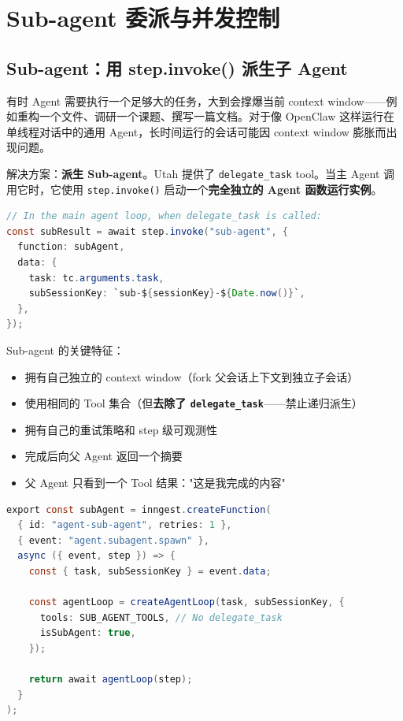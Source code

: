 \section{Sub-agent 委派与并发控制}

\subsection{Sub-agent：用 step.invoke() 派生子 Agent}

有时 Agent 需要执行一个足够大的任务，大到会撑爆当前 context window——例如重构一个文件、调研一个课题、撰写一篇文档。对于像 OpenClaw 这样运行在单线程对话中的通用 Agent，长时间运行的会话可能因 context window 膨胀而出现问题。

解决方案：\textbf{派生 Sub-agent}。Utah 提供了 \texttt{delegate\_task} tool。当主 Agent 调用它时，它使用 \texttt{step.invoke()} 启动一个\textbf{完全独立的 Agent 函数运行实例}。

\begin{lstlisting}[caption={主 Agent 委派子任务},language=Java]
// In the main agent loop, when delegate_task is called:
const subResult = await step.invoke("sub-agent", {
  function: subAgent,
  data: {
    task: tc.arguments.task,
    subSessionKey: `sub-${sessionKey}-${Date.now()}`,
  },
});
\end{lstlisting}

Sub-agent 的关键特征：

\begin{itemize}
    \item 拥有自己独立的 context window（fork 父会话上下文到独立子会话）
    \item 使用相同的 Tool 集合（但\textbf{去除了 \texttt{delegate\_task}}——禁止递归派生）
    \item 拥有自己的重试策略和 step 级可观测性
    \item 完成后向父 Agent 返回一个摘要
    \item 父 Agent 只看到一个 Tool 结果："这是我完成的内容"
\end{itemize}

\begin{lstlisting}[caption={Sub-agent 函数定义（简化版）},language=Java]
export const subAgent = inngest.createFunction(
  { id: "agent-sub-agent", retries: 1 },
  { event: "agent.subagent.spawn" },
  async ({ event, step }) => {
    const { task, subSessionKey } = event.data;

    const agentLoop = createAgentLoop(task, subSessionKey, {
      tools: SUB_AGENT_TOOLS, // No delegate_task
      isSubAgent: true,
    });

    return await agentLoop(step);
  }
);
\end{lstlisting}

